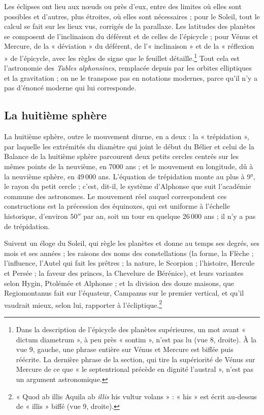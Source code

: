 \documentclass[11pt,a4paper]{article}
\begin{document}
Les éclipses ont lieu aux nœuds ou près d'eux, entre des limites où elles sont
possibles et d'autres, plus étroites, où elles sont nécessaires ; pour le Soleil,
tout le calcul se fait sur les lieux vus, corrigés de la parallaxe. Les latitudes
des planètes se composent de l'inclinaison du déférent et de celles de
l'épicycle ; pour Vénus et Mercure, de la « déviation » du déférent, de
l'« inclinaison » et de la « réflexion » de l'épicycle, avec les règles de
signe que le feuillet détaille.\footnote{Dans la description de l'épicycle des
planètes supérieures, un mot avant « dictum diametrum », à peu près « sontim »,
n'est pas lu (vue 8, droite). À la vue 9, gauche, une phrase entière sur
Vénus et Mercure est biffée puis réécrite. La dernière phrase de la section,
qui tire la supériorité de Vénus sur Mercure de ce que « le septentrional
précède en dignité l'austral », n'est pas un argument astronomique.} Tout cela
est l'astronomie des \emph{Tables alphonsines}, remplacée depuis par les
orbites elliptiques et la gravitation ; on ne le transpose pas en notations
modernes, parce qu'il n'y a pas d'énoncé moderne qui lui corresponde.

\subsection*{La huitième sphère}

La huitième sphère, outre le mouvement diurne, en a deux : la
« trépidation », par laquelle les extrémités du diamètre qui joint le début du
Bélier et celui de la Balance de la huitième sphère parcourent deux petits
cercles centrés sur les mêmes points de la neuvième, en 7000 ans ; et le
mouvement en longitude, dû à la neuvième sphère, en 49\,000 ans. L'équation de
trépidation monte au plus à 9°, le rayon du petit cercle ; c'est, dit-il, le
système d'Alphonse que suit l'académie commune des astronomes. Le mouvement réel
auquel correspondent ces constructions est la précession des équinoxes, qui est
uniforme à l'échelle historique, d'environ $50''$ par an, soit un tour en
quelque 26\,000 ans ; il n'y a pas de trépidation.

Suivent un éloge du Soleil, qui règle les planètes et donne au temps ses degrés,
ses mois et ses années ; les raisons des noms des constellations (la forme, la
Flèche ; l'influence, l'Autel qui fait les prêtres ; la nature, le Scorpion ;
l'histoire, Hercule et Persée ; la faveur des princes, la Chevelure de
Bérénice), et leurs variantes selon Hygin, Ptolémée et Alphonse ; et la division
des douze maisons, que Regiomontanus fait sur l'équateur, Campanus sur le
premier vertical, et qu'il vaudrait mieux, selon lui, rapporter à
l'écliptique.\footnote{« Quod ab illis Aquila ab \emph{illis} his vultur
volans » : « his » est écrit au-dessus de « illis » biffé (vue 9, droite).}
\end{document}
